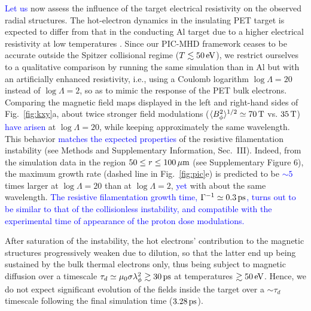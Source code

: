 \documentclass[aps,showpacs,superscriptaddress]{revtex4}
\begin{document}
\textcolor{blue}{Let us} now assess the influence of the target electrical resistivity on the observed radial structures. The hot-electron dynamics in the insulating PET target is expected to differ from that in the conducting Al target due to a higher electrical resistivity at low temperatures \cite{PRL_Fuchs_2003, PRL_McKenna_2011}. Since our PIC-MHD framework ceases to be accurate outside the Spitzer collisional regime ($T\lesssim 50\,\rm eV$), we restrict ourselves to a qualitative comparison by running the same simulation than in Al but with an artificially enhanced resistivity, i.e., using a Coulomb logarithm $\log \Lambda = 20$ instead of $\log \Lambda = 2$, so as to mimic the response of the PET bulk electrons. Comparing the magnetic field maps displayed in the left and right-hand sides of Fig.~\ref{fig:kxy}a, about twice stronger field modulations ($\langle B_\phi^2 \rangle^{1/2} \simeq 70\,\rm T$ vs. $35\,\rm T$) \textcolor{blue}{have arisen} at $\log \Lambda = 20$, while keeping approximately the same wavelength. This behavior \textcolor{blue}{matches the expected properties}
of the resistive filamentation instability (see Methods and Supplementary Information, Sec.~III). Indeed, from the simulation data in the region $50 \le r \le 100\,\rm \mu m$ (see Supplementary Figure 6), the maximum growth rate (dashed line in Fig.~\ref{fig:pic}e) is predicted to be \textcolor{blue}{$\sim 5$} times larger at $\log \Lambda = 20$ than at $\log \Lambda = 2$, \textcolor{blue}{yet} with about the same wavelength. \textcolor{blue}{The resistive filamentation growth time, $\Gamma^{-1} \simeq 0.3\,\rm ps$, turns out to be similar to that of the collisionless instability, and compatible with the experimental time of appearance of the proton dose modulations.} 

After saturation of the instability, the hot electrons' contribution to the magnetic structures progressively weaken due to dilution, so that the latter end up being sustained by the bulk thermal electrons only, thus being subject to magnetic diffusion over a timescale $\tau_d \simeq \mu_0 \sigma \lambda_\phi^2 \gtrsim 30\,\rm ps$ at temperatures $\gtrsim 50\,\rm eV$. Hence, we do not expect significant evolution of the fields inside the target over a $\sim \tau_d$ timescale following the final simulation time ($3.28\,\rm ps$).
\end{document}
